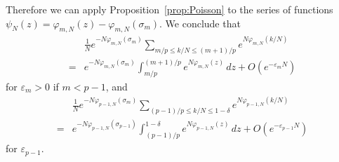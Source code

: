 \documentclass[a4paper,dvipdfmx]{amsart}
\theoremstyle{plain}
\theoremstyle{definition}
\theoremstyle{remark}
\newcommand{\saddle}{\sigma}
\numberwithin{equation}{section}
\begin{document}
Therefore we can apply Proposition~\ref{prop:Poisson} to the series of functions $\psi_{N}(z)=\varphi_{m,N}(z)-\varphi_{m,N}(\saddle_m)$.
We conclude that
\begin{equation}\label{eq:sum_integral_Phi}
\begin{split}
  &\frac{1}{N}
  e^{-N\varphi_{m,N}(\saddle_m)}
  \sum_{m/p\le k/N\le(m+1)/p}
  e^{N\varphi_{m,N}(k/N)}
  \\
  =&
  e^{-N\varphi_{m,N}(\saddle_m)}
  \int_{m/p}^{(m+1)/p}
  e^{N\varphi_{m,N}(z)}
  \,dz
  +
  O(e^{-\varepsilon_mN})
\end{split}
\end{equation}
for $\varepsilon_m>0$ if $m<p-1$, and
\begin{equation}\label{eq:sum_integral_Phi_p-1}
\begin{split}
  &\frac{1}{N}
  e^{-N\varphi_{p-1,N}(\saddle_m)}
  \sum_{(p-1)/p\le k/N\le1-\delta}
  e^{N\varphi_{p-1,N}(k/N)}
  \\
  =&
  e^{-N\varphi_{p-1,N}(\saddle_{p-1})}
  \int_{(p-1)/p}^{1-\delta}
  e^{N\varphi_{p-1,N}(z)}
  \,dz
  +
  O(e^{-\varepsilon_{p-1}N})
\end{split}
\end{equation}
for $\varepsilon_{p-1}$.
\end{document}
